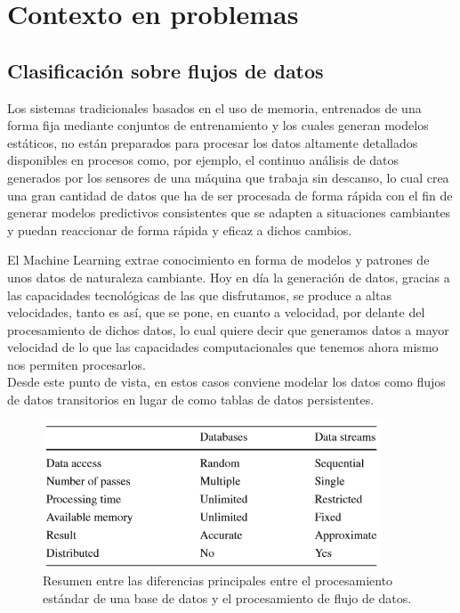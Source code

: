 \chapter[Capítulo 2. Contexto en problemas]{Contexto en problemas}

\section{Clasificación sobre flujos de datos}

Los sistemas tradicionales basados en el uso de memoria, entrenados de una forma fija mediante conjuntos de entrenamiento y los cuales generan modelos estáticos, no están
preparados para procesar los datos altamente detallados disponibles en procesos como, por ejemplo, el continuo análisis de datos generados por los sensores de una máquina que trabaja sin descanso, lo cual crea una gran cantidad de datos que ha de ser procesada de forma rápida con el fin de generar modelos predictivos consistentes
que se adapten a situaciones cambiantes y puedan reaccionar de forma rápida y eficaz a dichos cambios.

El Machine Learning extrae conocimiento en forma de modelos y patrones de unos datos de naturaleza cambiante. Hoy en día la generación de datos, gracias a las capacidades
tecnológicas de las que disfrutamos, se produce a altas velocidades, tanto es así, que se pone, en cuanto a velocidad, por delante del procesamiento de dichos datos, lo cual
quiere decir que generamos datos a mayor velocidad de lo que las capacidades computacionales que tenemos ahora mismo nos permiten procesarlos.\\
Desde este punto de vista, en estos casos conviene modelar los datos como flujos de datos transitorios en lugar de como tablas de datos persistentes.

\begin{figure}[H]
	\centering
	\includegraphics[width=0.9\textwidth]{imagenes/tabla1} 
	\caption{Resumen entre las diferencias principales entre el procesamiento estándar de una base de datos y el procesamiento de flujo de datos. \cite{ref1}}
\end{figure}



